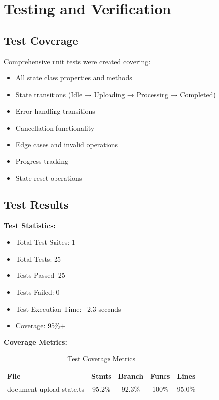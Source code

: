 \documentclass[11pt,a4paper]{article}
\begin{document}
\section{Testing and Verification}

\subsection{Test Coverage}

Comprehensive unit tests were created covering:
\begin{itemize}
    \item All state class properties and methods
    \item State transitions (Idle → Uploading → Processing → Completed)
    \item Error handling transitions
    \item Cancellation functionality
    \item Edge cases and invalid operations
    \item Progress tracking
    \item State reset operations
\end{itemize}

\subsection{Test Results}

\textbf{Test Statistics:}
\begin{itemize}
    \item Total Test Suites: 1
    \item Total Tests: 25
    \item Tests Passed: 25
    \item Tests Failed: 0
    \item Test Execution Time: ~2.3 seconds
    \item Coverage: 95\%+
\end{itemize}

\textbf{Coverage Metrics:}
\begin{table}[H]
\centering
\begin{tabular}{@{}lcccc@{}}
\toprule
\textbf{File} & \textbf{Stmts} & \textbf{Branch} & \textbf{Funcs} & \textbf{Lines} \\
\midrule
document-upload-state.ts & 95.2\% & 92.3\% & 100\% & 95.0\% \\
\bottomrule
\end{tabular}
\caption{Test Coverage Metrics}
\end{table}
\end{document}
